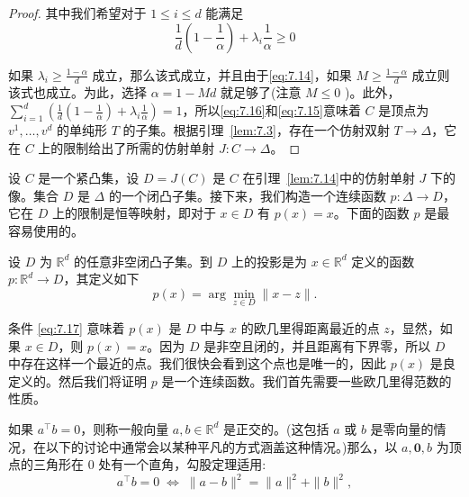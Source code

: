 \begin{proof}
其中我们希望对于 \(1 \leq  i \leq  d\) 能满足
\begin{equation}
\frac{1}{d}\left( {1 - \frac{1}{\alpha }}\right)  + {\lambda }_{i}\frac{1}{\alpha } \geq  0\label{eq:7.16}
\end{equation}

如果 \({\lambda }_{i} \geq  \frac{1 - \alpha }{d}\) 成立，那么该式成立，并且由于\eqref{eq:7.14}，如果 \(M \geq  \frac{1 - \alpha }{d}\) 成立则该式也成立。为此，选择 \(\alpha  = 1 - {Md}\) 就足够了(注意 \(M \leq  0\) )。此外， \(\mathop{\sum }\limits_{{i = 1}}^{d}\left( {\frac{1}{d}\left( {1 - \frac{1}{\alpha }}\right)  + {\lambda }_{i}\frac{1}{\alpha }}\right)  = 1\)，所以\eqref{eq:7.16}和\eqref{eq:7.15}意味着 \(C\) 是顶点为 \({v}^{1},\ldots,{v}^{d}\) 的单纯形 \(T\) 的子集。根据引理~\ref{lem:7.3}，存在一个仿射双射 \(T \rightarrow  \Delta\)，它在 \(C\) 上的限制给出了所需的仿射单射 \(J : C \rightarrow  \Delta\)。
\end{proof}
\bigskip

设 \(C\) 是一个紧凸集，设 \(D = J\left( C\right)\) 是 \(C\) 在引理~\ref{lem:7.14}中的仿射单射 \(J\) 下的像。集合 \(D\) 是 \(\Delta\) 的一个闭凸子集。接下来，我们构造一个连续函数 \(p : \Delta  \rightarrow  D\)，它在 \(D\) 上的限制是恒等映射，即对于 \(x \in  D\) 有 \(p\left( x\right)  = x\)。下面的函数 \(p\) 是最容易使用的。

设 \(D\) 为 \({\mathbb{R}}^{d}\) 的任意非空闭凸子集。到 \(D\) 上的投影是为 \(x \in  {\mathbb{R}}^{d}\) 定义的函数 \(p : {\mathbb{R}}^{d} \rightarrow  D\)，其定义如下
\begin{equation}
p\left( x\right)  = \arg \mathop{\min }\limits_{{z \in  D}}\parallel x - z\parallel .\label{eq:7.17}
\end{equation}

条件 \eqref{eq:7.17} 意味着 \(p\left( x\right)\) 是 \(D\) 中与 \(x\) 的欧几里得距离最近的点 \(z\)，显然，如果 \(x \in  D\)，则 \(p\left( x\right)  = x\)。因为 \(D\) 是非空且闭的，并且距离有下界零，所以 \(D\) 中存在这样一个最近的点。我们很快会看到这个点也是唯一的，因此 \(p\left( x\right)\) 是良定义的。然后我们将证明 \(p\) 是一个连续函数。我们首先需要一些欧几里得范数的性质。

如果 \({a}^{\top }b = 0\)，则称一般向量 \(a,b \in  {\mathbb{R}}^{d}\) 是正交的。(这包括 \(a\) 或 \(b\) 是零向量的情况，在以下的讨论中通常会以某种平凡的方式涵盖这种情况。)那么，以 \(a,\mathbf{0},b\) 为顶点的三角形在 0 处有一个直角，勾股定理适用:
\[
{a}^{\top }b = 0\; \Leftrightarrow  \;\| a - b\|^{2} = \|a\|^{2} + \|b\|^{2},
\]

